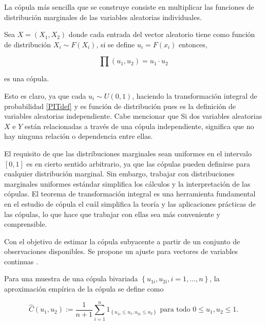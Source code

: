 \begin{ejemplo}
    La cópula más sencilla que se construye consiste en multiplicar las funciones de distribución marginales de las variables aleatorias individuales.

    Sea $X = (X_1, X_2)$ donde cada entrada del vector aleatorio tiene como función de distribución $X_i \sim F(X_i)$, si se define $u_i = F(x_i)$ entonces,

    \begin{equation}
         \prod (u_1, u_2) = u_1 \cdot u_2
    \end{equation}

    es una cópula.

    Esto es claro, ya que cada $u_i \sim U(0, 1)$, haciendo la transformación integral de probabilidad \ref{PITdef} y es función de distribución pues es la definición de variables aleatorias independiente. Cabe mencionar que Si dos variables aleatorias $X$ e $Y$ están relacionadas a través de una cópula independiente, significa que no hay ninguna relación o dependencia entre ellas.
\end{ejemplo}

El requisito de que las distribuciones marginales sean uniformes en el intervalo $[0,1]$ es en cierto sentido arbitrario, ya que las cópulas pueden definirse para cualquier distribución marginal. Sin embargo, trabajar con distribuciones marginales uniformes estándar simplifica los cálculos y la interpretación de las cópulas. El teorema de transformación integral es una herramienta fundamental en el estudio de cópula el cuál simplifica la teoría y las aplicaciones prácticas de las cópulas, lo que hace que trabajar con ellas sea más conveniente y comprensible. \cite{CopulasR}

Con el objetivo de estimar la cópula subyacente a partir de un conjunto de observaciones disponibles. Se propone un ajuste para vectores de variables continuas \cite{CopulasR}.

\begin{defn}
    Para una muestra de una cópula bivariada $\left\{u_{1 i}, u_{2 i}, i=1, \ldots, n\right\}$, la aproximación empírica de la cópula se define como

    \begin{equation}
        \hat{C}\left(u_1, u_2\right):=\frac{1}{n+1} \sum_{i=1}^n 1_{\left\{u_{1 i} \leq u_1, u_{2 i} \leq u_2\right\}} \text { para todo } 0 \leq u_1, u_2 \leq 1.
    \end{equation}
\end{defn}

